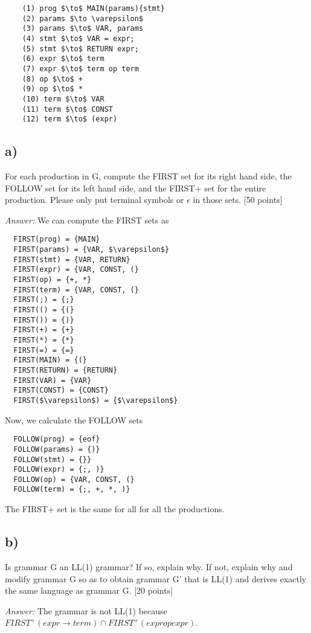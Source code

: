 \documentclass{article}
\begin{document}
\begin{lstlisting}
    (1) prog $\to$ MAIN(params){stmt}
    (2) params $\to \varepsilon$
    (3) params $\to$ VAR, params
    (4) stmt $\to$ VAR = expr;
    (5) stmt $\to$ RETURN expr;
    (6) expr $\to$ term
    (7) expr $\to$ term op term 
    (8) op $\to$ +
    (9) op $\to$ *
    (10) term $\to$ VAR
    (11) term $\to$ CONST
    (12) term $\to$ (expr)
\end{lstlisting}

\subsection*{a)}
For each production in G, compute the FIRST set for its right hand side,
the FOLLOW set for its left hand side, and the FIRST+ set for the entire
production. Please only put terminal symbols or $\epsilon$ in those sets. [50 points]

\textit{Answer:}
We can compute the FIRST sets as
\begin{lstlisting}
  FIRST(prog) = {MAIN}
  FIRST(params) = {VAR, $\varepsilon$}
  FIRST(stmt) = {VAR, RETURN}
  FIRST(expr) = {VAR, CONST, (}
  FIRST(op) = {+, *}
  FIRST(term) = {VAR, CONST, (}
  FIRST(;) = {;}
  FIRST(() = {(}
  FIRST()) = {)}
  FIRST(+) = {+}
  FIRST(*) = {*}
  FIRST(=) = {=}
  FIRST(MAIN) = {(}
  FIRST(RETURN) = {RETURN}
  FIRST(VAR) = {VAR}
  FIRST(CONST) = {CONST}
  FIRST($\varepsilon$) = {$\varepsilon$}
\end{lstlisting}

Now, we calculate the FOLLOW sets
\begin{lstlisting}
  FOLLOW(prog) = {eof}
  FOLLOW(params) = {)}
  FOLLOW(stmt) = {}}
  FOLLOW(expr) = {;, )}
  FOLLOW(op) = {VAR, CONST, (}
  FOLLOW(term) = {;, +, *, )}
\end{lstlisting}

The FIRST+ set is the same for all for all the productions.


\subsection*{b)}
Is grammar G an LL(1) grammar? If so, explain why. If not, explain why and
modify grammar G so as to obtain grammar G' that is LL(1) and derives
exactly the same language as grammar G. [20 points]



\textit{Answer:}
The grammar is not LL(1) because 
$FIRST^+(expr \to term) \cap FIRST^+(expr op expr)$.
\end{document}
